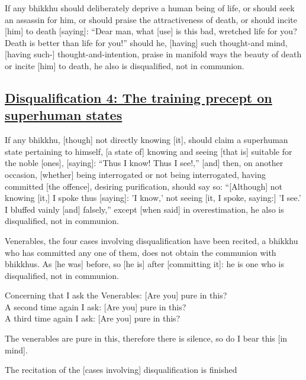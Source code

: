 If any bhikkhu should deliberately deprive a human being of life, or should seek an assassin for him, or should praise the attractiveness of death, or should incite [him] to death [saying]: ``Dear man, what [use] is this bad, wretched life for you? Death is better than life for you!'' should he, [having] such thought-and mind, [having such-] thought-and-intention, praise in manifold ways the beauty of death or incite [him] to death, he also is disqualified, not in communion.



\subsection*{\hyperref[par4]{Disqualification 4: The training precept on superhuman states}}
\label{disq4}

If any bhikkhu, [though] not directly knowing [it], should claim a superhuman state pertaining to himself, [a state of] knowing and seeing [that is] suitable for the noble [ones], [saying]: ``Thus I know! Thus I see!,'' [and] then, on another occasion, [whether] being interrogated or not being interrogated, having committed [the offence], desiring purification, should say so: ``[Although] not knowing [it,] I spoke thus [saying]: 'I know,' not seeing [it, I spoke, saying:] 'I see.' I bluffed vainly [and] falsely,'' except [when said] in overestimation, he also is disqualified, not in communion.



\medskip

\begin{center}
	Venerables, the four cases involving disqualification have been recited, a bhikkhu who has committed any one of them, does not obtain the communion with bhikkhus. As [he was] before, so [he is] after [committing it]: he is one who is disqualified, not in communion.

	\smallskip

	Concerning that I ask the Venerables: [Are you] pure in this?\\
	A second time again I ask: [Are you] pure in this?\\
	A third time again I ask: [Are you] pure in this?

	\smallskip

	The venerables are pure in this, therefore there is silence, so do I bear this [in mind].
\end{center}

\begin{outro}
	The recitation of the [cases involving] disqualification is finished
\end{outro}

\clearpage

